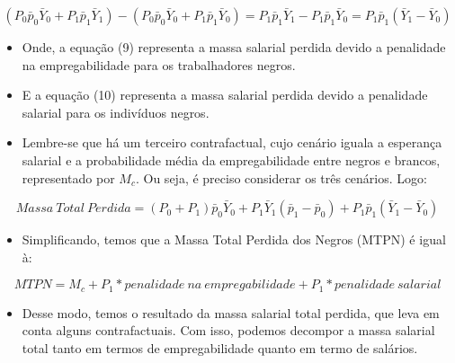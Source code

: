 \documentclass{article}
\begin{document}
	\begin{equation}
	(P_{0}\bar{p}_{0} \bar{Y}_{0} + P_{1}\bar{p}_{1} \bar{Y}_{1}) - (P_{0}\bar{p}_{0} \bar{Y}_{0} + P_{1}\bar{p}_{1} \bar{Y}_{0}) = P_{1}\bar{p}_{1} \bar{Y}_{1} - P_{1}\bar{p}_{1} \bar{Y}_{0} = P_{1}\bar{p}_{1}(\bar{Y}_{1} - \bar{Y}_{0})
	\end{equation}
	
\begin{itemize}
	\item Onde, a equação (9) representa a massa salarial perdida devido a penalidade na empregabilidade para os trabalhadores negros.
	\item E a equação (10) representa a massa salarial perdida devido a penalidade salarial para os indivíduos negros.
	\item  Lembre-se que há um terceiro contrafactual, cujo cenário iguala a esperança salarial e a probabilidade média da empregabilidade entre negros e brancos, representado por $M_{c}$. Ou seja, é preciso considerar os três cenários. Logo:
\end{itemize}

	\begin{equation}
	Massa\ Total\ Perdida = (P_{0} + P_{1})\bar{p}_{0}\bar{Y}_{0} + P_{1}\bar{Y}_{1}(\bar{p}_{1} - \bar{p}_{0}) + P_{1}\bar{p}_{1}(\bar{Y}_{1} - \bar{Y}_{0})
	\end{equation}
	
\begin{itemize}
	\item Simplificando, temos que a Massa Total Perdida dos Negros (MTPN) é igual à:
\end{itemize}
	
	\begin{equation}
		 MTPN = M_{c} + P_{1}*penalidade\ na\ empregabilidade + P_{1}*penalidade\ salarial
	\end{equation}
	
\begin{itemize}
	\item Desse modo, temos o resultado da massa salarial total perdida, que leva em conta alguns contrafactuais. Com isso, podemos decompor a massa salarial total tanto em termos de empregabilidade quanto em termo de salários.
\end{itemize}

	
\end{document}
